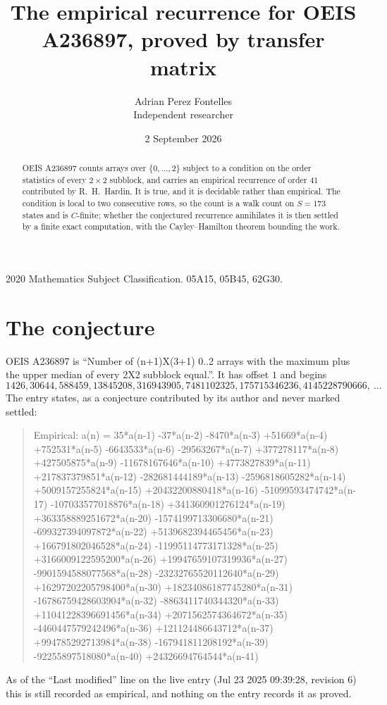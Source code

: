 \documentclass[11pt,a4paper]{article}
\title{The empirical recurrence for OEIS A236897, proved by transfer matrix}
\author{Adrian Perez Fontelles\\ \small Independent researcher}
\date{2 September 2026}
\theoremstyle{plain}
\theoremstyle{definition}
\begin{document}
\maketitle

\begin{abstract}
OEIS A236897 counts arrays over $\{0,\dots,2\}$ subject to a condition on the order
statistics of every $2\times2$ subblock, and carries an empirical recurrence of order
$41$ contributed by R.~H.~Hardin. It is true, and it is decidable rather than empirical.
The condition is local to two consecutive rows, so the count is a walk count on $S=173$
states and is $C$-finite; whether the conjectured recurrence annihilates it is then settled by
a finite exact computation, with the Cayley--Hamilton theorem bounding the work.
\end{abstract}

\noindent\small 2020 Mathematics Subject Classification. 05A15, 05B45, 62G30.\normalsize

\section{The conjecture}

OEIS A236897 is ``Number of (n+1)X(3+1) 0..2 arrays with the maximum plus the upper median of every 2X2 subblock equal.''. It has offset $1$ and begins
\[
1426, 30644, 588459, 13845208, 316943905, 7481102325, 175715346236, 4145228790666,\ \dots
\]
The entry states, as a conjecture contributed by its author and never marked settled:
\begin{quote}
Empirical: a(n) = 35*a(n-1) -37*a(n-2) -8470*a(n-3) +51669*a(n-4) +752531*a(n-5) -6643533*a(n-6) -29563267*a(n-7) +377278117*a(n-8) +427505875*a(n-9) -11678167646*a(n-10) +4773827839*a(n-11) +217837379851*a(n-12) -282681444189*a(n-13) -2596818605282*a(n-14) +5009157255824*a(n-15) +20432200880418*a(n-16) -51099593474742*a(n-17) -107033577018876*a(n-18) +341360901276124*a(n-19) +363358889251672*a(n-20) -1574199713306680*a(n-21) -699327394097872*a(n-22) +5139682394465456*a(n-23) +166791802046528*a(n-24) -11995114773171328*a(n-25) +3166009122595200*a(n-26) +19947659107319936*a(n-27) -9901594588077568*a(n-28) -23232765520112640*a(n-29) +16297202205798400*a(n-30) +18234086187745280*a(n-31) -16786759428603904*a(n-32) -8863411740344320*a(n-33) +11041228396691456*a(n-34) +2071562574364672*a(n-35) -4460447579242496*a(n-36) +121124486643712*a(n-37) +994785292713984*a(n-38) -167941811208192*a(n-39) -92255897518080*a(n-40) +24326694764544*a(n-41)
\end{quote}
As of the ``Last modified'' line on the live entry (Jul 23 2025 09:39:28, revision 6) this is still
recorded as empirical, and nothing on the entry records it as proved.
\end{document}
